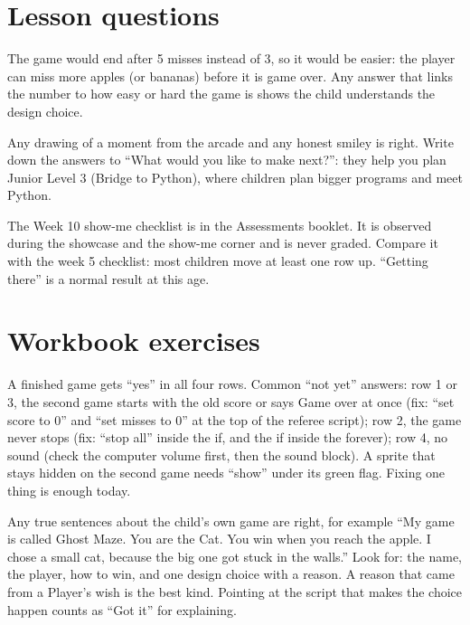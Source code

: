 
\section{Lesson questions}
\begin{answer}
The game would end after 5 misses instead of 3, so it would be easier: the player can miss more apples (or bananas) before it is game over. Any answer that links the number to how easy or hard the game is shows the child understands the design choice.
\end{answer}

\begin{answer}[Reflection]
Any drawing of a moment from the arcade and any honest smiley is right. Write down the answers to \enquote{What would you like to make next?}: they help you plan Junior Level 3 (Bridge to Python), where children plan bigger programs and meet Python.
\end{answer}

\begin{answer}
The Week 10 show-me checklist is in the Assessments booklet. It is observed during the showcase and the show-me corner and is never graded. Compare it with the week 5 checklist: most children move at least one row up. \enquote{Getting there} is a normal result at this age.
\end{answer}

\section{Workbook exercises}
\begin{answer}
A finished game gets \enquote{yes} in all four rows. Common \enquote{not yet} answers: row 1 or 3, the second game starts with the old score or says Game over at once (fix: \enquote{set score to 0} and \enquote{set misses to 0} at the top of the referee script); row 2, the game never stops (fix: \enquote{stop all} inside the if, and the if inside the forever); row 4, no sound (check the computer volume first, then the sound block). A sprite that stays hidden on the second game needs \enquote{show} under its green flag. Fixing one thing is enough today.
\end{answer}

\begin{answer}
Any true sentences about the child's own game are right, for example \enquote{My game is called Ghost Maze. You are the Cat. You win when you reach the apple. I chose a small cat, because the big one got stuck in the walls.} Look for: the name, the player, how to win, and one design choice with a reason. A reason that came from a Player's wish is the best kind. Pointing at the script that makes the choice happen counts as \enquote{Got it} for explaining.
\end{answer}

